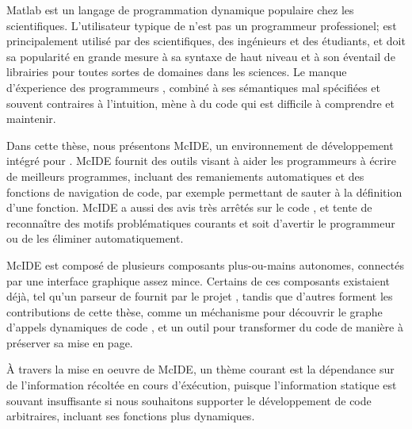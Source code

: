 {\sc Matlab}\textsuperscript{\textregistered} est un langage de programmation
dynamique populaire chez les scientifiques. L'utilisateur typique de \matlab
n'est pas un programmeur professionel; \matlab est
principalement utilis\'{e} par des scientifiques, des ing\'{e}nieurs et des
\'{e}tudiants, et doit sa popularit\'{e} en grande mesure \`{a} sa syntaxe de
haut niveau et \`{a} son \'{e}ventail de librairies pour toutes sortes de
domaines dans les sciences. Le manque d'\'{e}xperience des programmeurs
\matlab, combin\'{e} \`{a} ses s\'{e}mantiques mal sp\'{e}cifi\'{e}es et
souvent contraires \`{a} l'intuition, m\`{e}ne \`{a} du code \matlab qui est
difficile \`{a} comprendre et maintenir.

Dans cette th\`{e}se, nous pr\'{e}sentons McIDE, un environnement de
d\'{e}veloppement int\'{e}gr\'{e} pour \matlab. McIDE fournit des outils visant
\`{a} aider les programmeurs \matlab \`{a} \'{e}crire de meilleurs programmes,
incluant des remaniements automatiques et des fonctions de navigation de code,
par exemple permettant de sauter \`{a} la d\'{e}finition d'une fonction. McIDE
a aussi des avis tr\`{e}s arr\^{e}t\'{e}s sur le code \matlab, et tente de
reconna\^{i}tre des motifs probl\'{e}matiques courants et soit d'avertir le
programmeur ou de les \'{e}liminer automatiquement.

McIDE est compos\'{e} de plusieurs composants plus-ou-mains autonomes,
connect\'{e}s par une interface graphique assez mince. Certains de ces
composants existaient d\'{e}j\`{a}, tel qu'un parseur de \matlab fournit par le
projet \mclab, tandis que d'autres forment les contributions de cette
th\`{e}se, comme un m\'{e}chanisme pour d\'{e}couvrir le graphe d'appels
dynamiques de code \matlab, et un outil pour transformer du code de mani\`{e}re
\`{a} pr\'{e}server sa mise en page.

\`{A} travers la mise en oeuvre de McIDE, un th\`{e}me courant est la
d\'{e}pendance sur de l'information r\'{e}colt\'{e}e en cours
d'\'{e}x\'{e}cution, puisque l'information statique est souvant insuffisante si
nous souhaitons supporter le d\'{e}veloppement de code \matlab arbitraires,
incluant ses fonctions plus dynamiques.
